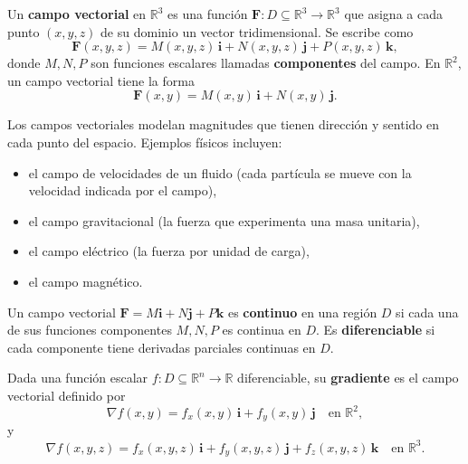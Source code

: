 \begin{definition}
Un \textbf{campo vectorial} en \(\mathbb{R}^3\) es una función
\(\mathbf{F}: D \subseteq \mathbb{R}^3 \to \mathbb{R}^3\) que asigna a
cada punto \((x,y,z)\) de su dominio un vector tridimensional. Se
escribe como
\[
\mathbf{F}(x,y,z) = M(x,y,z)\,\mathbf{i} + N(x,y,z)\,\mathbf{j}
+ P(x,y,z)\,\mathbf{k},
\]
donde \(M,N,P\) son funciones escalares llamadas \textbf{componentes}
del campo. En \(\mathbb{R}^2\), un campo vectorial tiene la forma
\[
\mathbf{F}(x,y) = M(x,y)\,\mathbf{i} + N(x,y)\,\mathbf{j}.
\]
\end{definition}
\begin{rem}
Los campos vectoriales modelan magnitudes que tienen dirección y
sentido en cada punto del espacio. Ejemplos físicos incluyen:
\begin{itemize}
  \item el campo de velocidades de un fluido (cada partícula se mueve
  con la velocidad indicada por el campo),
  \item el campo gravitacional (la fuerza que experimenta una masa
  unitaria),
  \item el campo eléctrico (la fuerza por unidad de carga),
  \item el campo magnético.
\end{itemize}
\end{rem}

\begin{definition}
Un campo vectorial \(\mathbf{F} = M\mathbf{i}+N\mathbf{j}+P\mathbf{k}\)
es \textbf{continuo} en una región \(D\) si cada una de sus funciones
componentes \(M,N,P\) es continua en \(D\). Es \textbf{diferenciable}
si cada componente tiene derivadas parciales continuas en \(D\).
\end{definition}

\begin{definition}
Dada una función escalar \(f: D \subseteq \mathbb{R}^n \to \mathbb{R}\)
diferenciable, su \textbf{gradiente} es el campo vectorial definido por
\[
\nabla f(x,y) = f_x(x,y)\,\mathbf{i} + f_y(x,y)\,\mathbf{j}
\quad \text{en } \mathbb{R}^2,
\]
y
\[
\nabla f(x,y,z) = f_x(x,y,z)\,\mathbf{i}
+ f_y(x,y,z)\,\mathbf{j}
+ f_z(x,y,z)\,\mathbf{k}
\quad \text{en } \mathbb{R}^3.
\]
\end{definition}


